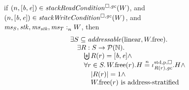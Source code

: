 \documentclass[a4paper]{article}
\begin{document}
\begin{lemma}
  if $\npair{[\baddr,\eaddr]} \in \stackReadCond{W}$, and
  $\npair{[\baddr,\eaddr]} \in \stackWriteCond{W}$, and\\
  $\mathit{ms}_S,\mathit{stk},\mathit{ms}_{\mathit{stk}},\mathit{ms}_T :_{n}^{}W$, then
  \[
    \begin{array}{l}
      \exists S \subseteq \addressable{\linear,\pwfree} \ldotp \\
      \quad \exists R : S \fun \powerset{\nats} \ldotp \\
      \qquad \biguplus R(r) = [\baddr,\eaddr] \wedge \\
      \qquad \forall r \in S \ldotp \pwfree(r).H \nequal \stdreg{R(r),\gc}{\pur}.H \wedge \\
      \qquad \quad |R(r)| = 1 \wedge \\
      \qquad \quad \pwfree(r) \text{ is address-stratified}
    \end{array}
  \]
\end{lemma}
\end{document}
